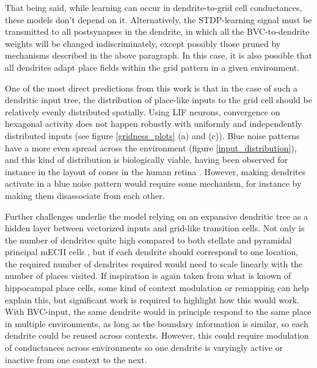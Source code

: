 \documentclass{article}
\begin{document}
    That being said, while learning can occur in dendrite-to-grid cell conductances, these models don't depend on it. Alternatively, the STDP-learning signal must be transmitted to all postsynapses in the dendrite, in which all the BVC-to-dendrite weights will be changed indiscriminately, except possibly those pruned by mechanisms described in the above paragraph. In this case, it is also possible that all dendrites adapt place fields within the grid pattern in a given environment.

    One of the most direct predictions from this work is that in the case of such a dendritic input tree, the distribution of place-like inputs to the grid cell should be relatively evenly distributed spatially. Using LIF neurons, convergence on hexagonal activity does not happen robustly with uniformly and independently distributed inputs (see figure \ref{gridness_plots} (a) and (c)). Blue noise patterns have a more even spread across the environment (figure \ref{input_distribution}), and this kind of distribution is biologically viable, having been observed for instance in the layout of cones in the human retina \parencite{Yellott1983}. However, making dendrites activate in a blue noise pattern would require some mechanism, for instance by making them disassociate from each other.

    Further challenges underlie the model relying on an expansive dendritic tree as a hidden layer between vectorized inputs and grid-like transition cells. Not only is the number of dendrites quite high compared to both stellate and pyramidal principal mECII cells \parencite{Klink1997}, but if each dendrite should correspond to one location, the required number of dendrites required would need to scale linearly with the number of places visited. If inspiration is again taken from what is known of hippocampal place cells, some kind of context modulation or remapping can help explain this, but significant work is required to highlight how this would work. With BVC-input, the same dendrite would in principle respond to the same place in multiple environments, as long as the boundary information is similar, so each dendrite could be reused across contexts. However, this could require modulation of conductances across environments so one dendrite is varyingly active or inactive from one context to the next.
\end{document}
